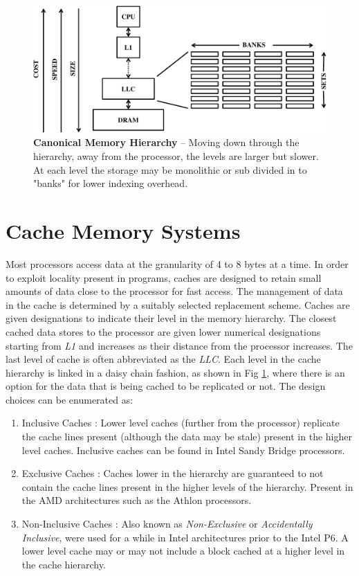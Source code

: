 \begin{figure}[ht]
  \begin{center}
    \includegraphics[width=\textwidth]{files/Figures/05-MemoryHierarchy.pdf}
    \caption[Canonical Memory Hierarchy]{\textbf{Canonical Memory Hierarchy} -- Moving down through the hierarchy, away from the processor, the levels are larger but slower. At each level the storage may be monolithic or sub divided in to "banks" for lower indexing overhead.}
    \label{fig:memory_hierarchy}
  \end{center}
\end{figure}

\section{Cache Memory Systems}
\label{sec:cache_memory_systems}
Most processors access data at the granularity of 4 to 8 bytes at a time. In order to exploit locality present in programs, caches are designed to retain small amounts of data close to the processor for fast access. The management of data in the cache is determined by a suitably selected replacement scheme. Caches are given designations to indicate their level in the memory hierarchy. The closest cached data stores to the processor are given lower numerical designations starting from \textit{L1} and increases as their distance from the processor increases. The last level of cache is often abbreviated as the \textit{LLC}. Each level in the cache hierarchy is linked in a daisy chain fashion, as shown in Fig \ref{fig:memory_hierarchy}, where there is an option for the data that is being cached to be replicated or not. The design choices can be enumerated as:

\begin{enumerate}
  \item Inclusive Caches : Lower level caches (further from the processor) replicate the cache lines present (although the data may be stale) present in the higher level caches. Inclusive caches can be found in Intel Sandy Bridge processors.
  \item Exclusive Caches : Caches lower in the hierarchy are guaranteed to not contain the cache lines present in the higher levels of the hierarchy. Present in the AMD architectures such as the Athlon processors.
  \item Non-Inclusive Caches : Also known as \textit{Non-Exclusive} or \textit{Accidentally Inclusive}, were used for a while in Intel architectures prior to the Intel P6. A lower level cache may or may not include a block cached at a higher level in the cache hierarchy.
\end{enumerate}

